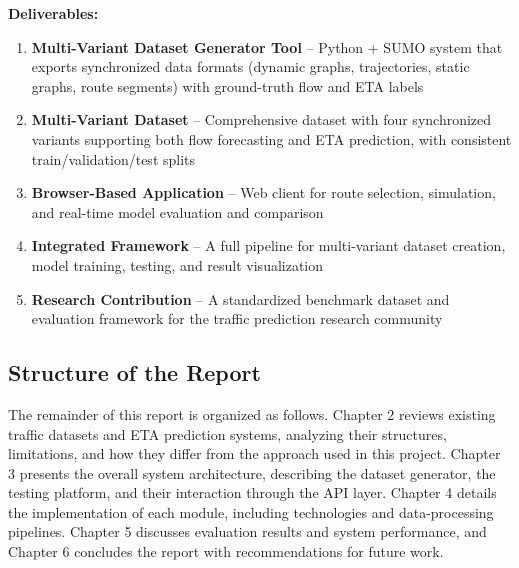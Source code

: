 \textbf{Deliverables:}

\begin{enumerate}
    \item \textbf{Multi-Variant Dataset Generator Tool} – Python + SUMO system that exports synchronized data formats (dynamic graphs, trajectories, static graphs, route segments) with ground-truth flow and ETA labels
    \item \textbf{Multi-Variant Dataset} – Comprehensive dataset with four synchronized variants supporting both flow forecasting and ETA prediction, with consistent train/validation/test splits
    \item \textbf{Browser-Based Application} – Web client for route selection, simulation, and real-time model evaluation and comparison
    \item \textbf{Integrated Framework} – A full pipeline for multi-variant dataset creation, model training, testing, and result visualization
    \item \textbf{Research Contribution} – A standardized benchmark dataset and evaluation framework for the traffic prediction research community
\end{enumerate}

\subsection{Structure of the Report}

The remainder of this report is organized as follows. Chapter 2 reviews existing traffic datasets and ETA prediction systems, analyzing their structures, limitations, and how they differ from the approach used in this project. Chapter 3 presents the overall system architecture, describing the dataset generator, the testing platform, and their interaction through the API layer. Chapter 4 details the implementation of each module, including technologies and data-processing pipelines. Chapter 5 discusses evaluation results and system performance, and Chapter 6 concludes the report with recommendations for future work.


